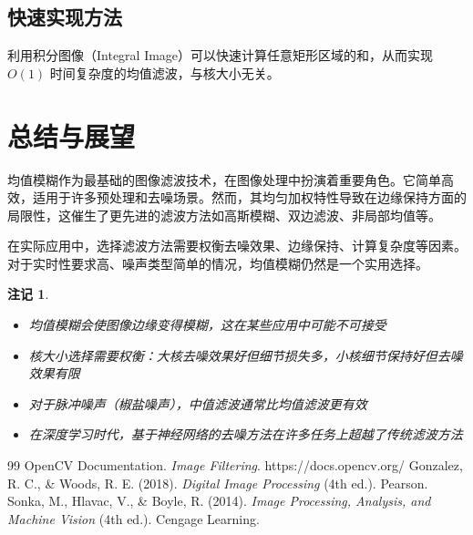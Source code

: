\documentclass{article}
\newtheorem{remark}{注记}[section]
\begin{document}
\subsection{快速实现方法}
利用积分图像（Integral Image）可以快速计算任意矩形区域的和，从而实现 $O(1)$ 时间复杂度的均值滤波，与核大小无关。

\section{总结与展望}

均值模糊作为最基础的图像滤波技术，在图像处理中扮演着重要角色。它简单高效，适用于许多预处理和去噪场景。然而，其均匀加权特性导致在边缘保持方面的局限性，这催生了更先进的滤波方法如高斯模糊、双边滤波、非局部均值等。

在实际应用中，选择滤波方法需要权衡去噪效果、边缘保持、计算复杂度等因素。对于实时性要求高、噪声类型简单的情况，均值模糊仍然是一个实用选择。

\begin{remark}
\begin{itemize}
    \item 均值模糊会使图像边缘变得模糊，这在某些应用中可能不可接受
    \item 核大小选择需要权衡：大核去噪效果好但细节损失多，小核细节保持好但去噪效果有限
    \item 对于脉冲噪声（椒盐噪声），中值滤波通常比均值滤波更有效
    \item 在深度学习时代，基于神经网络的去噪方法在许多任务上超越了传统滤波方法
\end{itemize}
\end{remark}

\begin{thebibliography}{99}
 OpenCV Documentation. \textit{Image Filtering}. https://docs.opencv.org/
 Gonzalez, R. C., \& Woods, R. E. (2018). \textit{Digital Image Processing} (4th ed.). Pearson.
 Sonka, M., Hlavac, V., \& Boyle, R. (2014). \textit{Image Processing, Analysis, and Machine Vision} (4th ed.). Cengage Learning.
\end{thebibliography}
\end{document}

